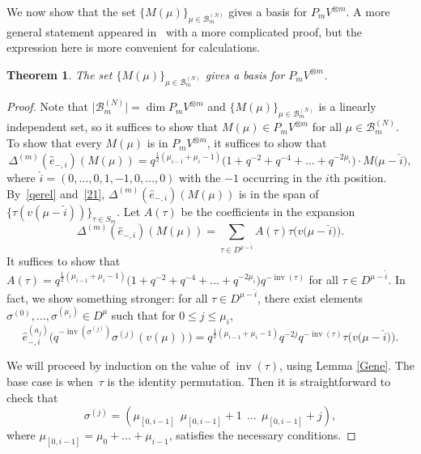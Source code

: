 \documentclass[pdftex]{sigma}
\numberwithin{equation}{section}
\newtheorem{Theorem}{Theorem}[section]
\DeclareMathOperator{\dimension}{dim}
\DeclareMathOperator{\inv}{inv}
\begin{document}
We now show that the set $ \{M(\mu)\}_{\mu\in \mathcal{B}^{(N)}_m} $ gives a basis for $ P_{m}V^{\otimes m} $. A more general statement appeared in~\cite{KIMRN} with a more complicated proof, but the expression here is more convenient for calculations.
\begin{Theorem}
	The set $ \{M(\mu)\}_{\mu\in \mathcal{B}^{(N)}_m} $ gives a basis for $ P_{m}V^{\otimes m} $.
\end{Theorem}
\begin{proof}
Note that $ \big|\mathcal{B}^{(N)}_m\big|= \dimension P_mV^{\otimes m} $ and $ \{M(\mu)\}_{\mu\in \mathcal{B}^{(N)}_m} $ is a linearly independent set, so it suffices to show that $ M(\mu) \in P_mV^{\otimes m} $ for all $ \mu \in \mathcal{B}^{(N)}_m $. To show that every $ M(\mu) $ is in $ P_{m}V^{\otimes m} $, it suffices to show that \begin{equation} \label{hati}
\Delta^{(m)}(\hat{e}_{-,i}) (M(\mu))=q^{\frac{1}{2}(\mu_{i-1}+\mu_i-1)} \big(1+q^{-2}+q^{-4}+\dots+q^{-2\mu_i}\big) \cdot M\big(\mu-\hat{i}\big),
\end{equation}
where $ \hat{i}=(0,\dots,0,1,-1,0,\dots,0) $ with the $ -1 $ occurring in the $ i $th position. By~\eqref{qerel} and~\eqref{21}, $ \Delta^{(m)} (\hat{e}_{-,i})(M(\mu)) $ is in the span of $ \{\tau(v(\mu-\hat{i}))\}_{\tau\in S_m}$. Let $ A(\tau) $ be the coefficients in the expansion
\[
 \Delta^{(m)} (\hat{e}_{-,i})(M(\mu)) = \sum_{\tau \in D^{\mu-\hat{i}}} A(\tau)\tau \big(v\big(\mu-\hat{i}\big)\big).
\]
It suffices to show that $A(\tau)= q^{\frac{1}{2}(\mu_{i-1}+\mu_i-1)}\big(1+q^{-2}+q^{-4}+\dots+q^{-2\mu_i}\big) q^{-\inv(\tau)}$ for all $\tau \in D^{\mu-\hat{i}}$. In fact, we show something stronger: for all $\tau \in D^{\mu-\hat{i}}$, there exist elements $\sigma^{(0)},\dots, \sigma^{(\mu_i)}\in D^{\mu}$ such that for $0 \leq j \leq \mu_i$,
\[
\hat{e}_{-,i}^{(a_j)} \big( q^{-\inv(\sigma^{(j)})} \sigma^{(j)}(v(\mu)) \big) = q^{\frac{1}{2}(\mu_{i-1}+\mu_i-1)} q^{-2j} q^{-\inv(\tau)} \tau\big(v\big(\mu- \hat{i}\big)\big).
\]

We will proceed by induction on the value of $\inv(\tau)$, using Lemma \ref{Gene}. The base case is when~$\tau$ is the identity permutation. Then it is straightforward to check that
\[
\sigma^{(j)} = (\mu_{[0,i-1]} \ \ \mu_{[0,i-1]}+1 \ \ \dots \ \ \mu_{[0,i-1]}+j),
\]
where $\mu_{[0,i-1]}= \mu_0 + \dots + \mu_{i-1}$, satisfies the necessary conditions.


\end{proof}
\end{document}
